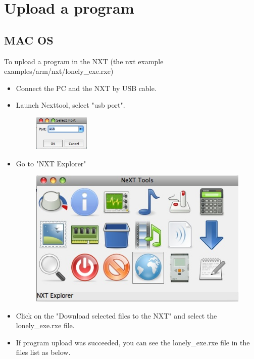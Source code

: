 \documentclass[10pt]{article}
\begin{document}
\section{Upload a program} \label{uploadprogram}
\subsection{MAC OS}
To upload a program in the NXT (the nxt example examples/arm/nxt/lonely\_exe.rxe)
\begin{itemize}
\item Connect the PC and the NXT by USB cable.
\item Launch Nexttool, select "usb port".
	\begin{figure}[htbp] %
   		\centering
		\includegraphics[width=0.25\textwidth]{pictures/usb_port.jpg}
	\end{figure}
\item Go to "NXT Explorer"
	\begin{figure}[htbp] %
   		\centering
		\includegraphics[width=.7\textwidth]{pictures/nxt_explorer.jpg}
	\end{figure}
\item Click on the "Download selected files to the NXT" and select the lonely\_exe.rxe file.
\item If program upload was succeeded, you can see the lonely\_exe.rxe file in the files list as below.
	\begin{figure}[h] %
   		\centering

\end{figure}
\end{itemize}
\end{document}
